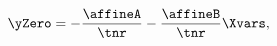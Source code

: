 \begin{equation} \label{eq:nYaffine}
	\yZero = - \frac{\affineA}{\tnr} - \frac{\affineB}{\tnr} \Xvars ,
\end{equation}